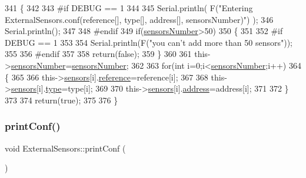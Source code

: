 \begin{DoxyCode}
341 \{
342 
343 \textcolor{preprocessor}{#if DEBUG == 1}
344 
345     Serial.println( F(\textcolor{stringliteral}{"Entering ExternalSensors.conf(reference[], type[], address[], sensorsNumber)"}) );
346     Serial.println();
347 
348 \textcolor{preprocessor}{#endif  }
349     \textcolor{keywordflow}{if}(\hyperlink{class_external_sensors_a58e4fbf9adeae787d92be5fa33043b5d}{sensorsNumber}>50)
350     \{
351     
352 \textcolor{preprocessor}{    #if DEBUG == 1}
353     
354         Serial.println(F(\textcolor{stringliteral}{"you can't add more than 50 sensors"}));    
355     
356 \textcolor{preprocessor}{    #endif  }
357     
358         \textcolor{keywordflow}{return}(\textcolor{keyword}{false});
359     \}
360 
361     this->\hyperlink{class_external_sensors_a58e4fbf9adeae787d92be5fa33043b5d}{sensorsNumber}=\hyperlink{class_external_sensors_a58e4fbf9adeae787d92be5fa33043b5d}{sensorsNumber};
362     
363     \textcolor{keywordflow}{for}(\textcolor{keywordtype}{int} i=0;i<\hyperlink{class_external_sensors_a58e4fbf9adeae787d92be5fa33043b5d}{sensorsNumber};i++)
364     \{
365     
366         this->\hyperlink{class_external_sensors_a284233f884fcf00154a44740cf1d9e1e}{sensors}[i].\hyperlink{struct_external_sensors_1_1sensor_afed5bdfd49732202a368b600cb8396fe}{reference}=reference[i];
367         
368         this->\hyperlink{class_external_sensors_a284233f884fcf00154a44740cf1d9e1e}{sensors}[i].\hyperlink{struct_external_sensors_1_1sensor_a6acfdb02c742c2110d7bd2b5d9fce9e7}{type}=type[i];
369 
370         this->\hyperlink{class_external_sensors_a284233f884fcf00154a44740cf1d9e1e}{sensors}[i].\hyperlink{struct_external_sensors_1_1sensor_a8d70ca58524521ed054fc6b81eb58d34}{address}=address[i];
371     
372     \}
373     
374     \textcolor{keywordflow}{return}(\textcolor{keyword}{true});
375 
376 \}
\end{DoxyCode}
\mbox{\label{class_external_sensors_a78c2bf55084435dd51d3c559b2d3c6f3}} 
\subsubsection{\texorpdfstring{print\+Conf()}{printConf()}}
{\footnotesize\ttfamily void External\+Sensors\+::print\+Conf (\begin{DoxyParamCaption}{ }\end{DoxyParamCaption})}

